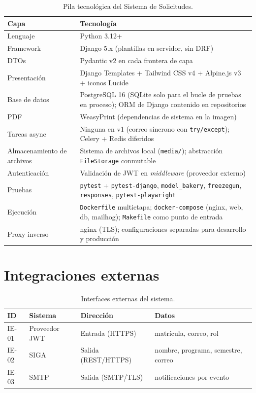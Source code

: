 \documentclass[12pt,letterpaper]{report}
\begin{document}
\begin{table}[H]
\centering
\caption{Pila tecnológica del Sistema de Solicitudes.}
\begin{tabularx}{\textwidth}{L{4.2cm} X}
\toprule
\textbf{Capa} & \textbf{Tecnología} \\
\midrule
Lenguaje      & Python 3.12+ \\
Framework     & Django 5.x (plantillas en servidor, sin DRF) \\
DTOs          & Pydantic v2 en cada frontera de capa \\
Presentación  & Django Templates + Tailwind CSS v4 + Alpine.js v3 + iconos Lucide \\
Base de datos & PostgreSQL 16 (SQLite solo para el bucle de pruebas en proceso); ORM de Django contenido en repositorios \\
PDF           & WeasyPrint (dependencias de sistema en la imagen) \\
Tareas async  & Ninguna en v1 (correo síncrono con \texttt{try/except}); Celery + Redis diferidos \\
Almacenamiento de archivos & Sistema de archivos local (\texttt{media/}); abstracción \texttt{FileStorage} conmutable \\
Autenticación & Validación de JWT en \textit{middleware} (proveedor externo) \\
Pruebas       & \texttt{pytest} + \texttt{pytest-django}, \texttt{model\_bakery}, \texttt{freezegun}, \texttt{responses}, \texttt{pytest-playwright} \\
Ejecución     & \texttt{Dockerfile} multietapa; \texttt{docker-compose} (nginx, web, db, mailhog); \texttt{Makefile} como punto de entrada \\
Proxy inverso & nginx (TLS); configuraciones separadas para desarrollo y producción \\
\bottomrule
\end{tabularx}
\end{table}

\section{Integraciones externas}

\begin{table}[H]
\centering
\caption{Interfaces externas del sistema.}
\begin{tabularx}{\textwidth}{L{2.2cm} L{3.2cm} L{2.4cm} X}
\toprule
\textbf{ID} & \textbf{Sistema} & \textbf{Dirección} & \textbf{Datos} \\
\midrule
IE-01 & Proveedor JWT & Entrada (HTTPS) & matrícula, correo, rol \\
IE-02 & SIGA          & Salida (REST/HTTPS) & nombre, programa, semestre, correo \\
IE-03 & SMTP          & Salida (SMTP/TLS) & notificaciones por evento \\
\bottomrule
\end{tabularx}
\end{table}
\end{document}
